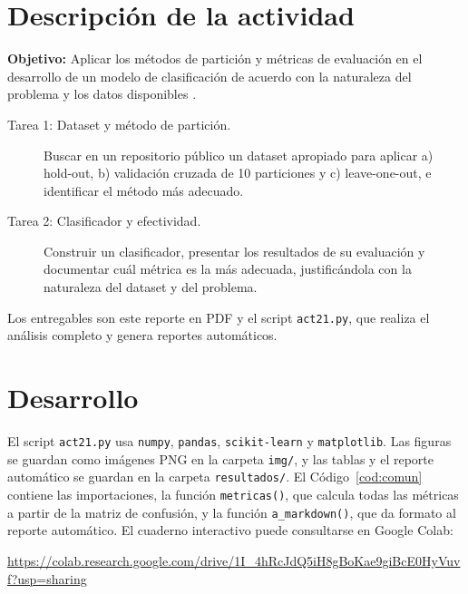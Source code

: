 \documentclass[11pt,letterpaper]{article}
\begin{document}
\section{Descripción de la actividad}

\textbf{Objetivo:} Aplicar los métodos de partición y métricas de evaluación en el desarrollo de un modelo de clasificación de acuerdo con la naturaleza del problema y los datos disponibles \parencite{tecnm2026_tema33}.

\begin{description}
    \item[Tarea 1: Dataset y método de partición.] Buscar en un repositorio público un dataset apropiado para aplicar a) hold-out, b) validación cruzada de 10 particiones y c) leave-one-out, e identificar el método más adecuado.
    \item[Tarea 2: Clasificador y efectividad.] Construir un clasificador, presentar los resultados de su evaluación y documentar cuál métrica es la más adecuada, justificándola con la naturaleza del dataset y del problema.
\end{description}

Los entregables son este reporte en PDF y el script \texttt{act21.py}, que realiza el análisis completo y genera reportes automáticos.

\section{Desarrollo}

El script \texttt{act21.py} usa \texttt{numpy}, \texttt{pandas}, \texttt{scikit-learn} y \texttt{matplotlib}. Las figuras se guardan como imágenes PNG en la carpeta \texttt{img/}, y las tablas y el reporte automático se guardan en la carpeta \texttt{resultados/}. El Código~\ref{cod:comun} contiene las importaciones, la función \texttt{metricas()}, que calcula todas las métricas a partir de la matriz de confusión, y la función \texttt{a\_markdown()}, que da formato al reporte automático. El cuaderno interactivo puede consultarse en Google Colab:

\begin{center}
    \url{https://colab.research.google.com/drive/1I_4hRcJdQ5iH8gBoKae9giBcE0HyVuvf?usp=sharing}
\end{center}
\end{document}
